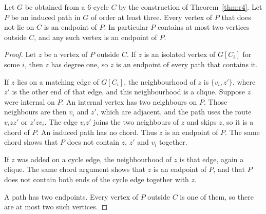 \documentclass[ASNA]{USG}
\theoremstyle{WBstyletwo}
\numberwithin{equation}{section}
\begin{document}
\begin{lemma}\label{lem:ends}
Let $G$ be obtained from a $6$-cycle $C$ by the construction of Theorem~\ref{thm:r4}. Let $P$ be an induced path in $G$ of order at least three. Every vertex of $P$ that does not lie on $C$ is an endpoint of $P$. In particular $P$ contains at most two vertices outside $C$, and any such vertex is an endpoint of $P$.
\end{lemma}

\begin{proof}
Let $z$ be a vertex of $P$ outside $C$. If $z$ is an isolated vertex of $G[C_i]$ for some $i$, then $z$ has degree one, so $z$ is an endpoint of every path that contains it.

If $z$ lies on a matching edge of $G[C_i]$, the neighbourhood of $z$ is $\{v_i,z'\}$, where $z'$ is the other end of that edge, and this neighbourhood is a clique. Suppose $z$ were internal on $P$. An internal vertex has two neighbours on $P$. Those neighbours are then $v_i$ and $z'$, which are adjacent, and the path uses the route $v_iz z'$ or $z'z v_i$. The edge $v_iz'$ joins the two neighbours of $z$ and skips $z$, so it is a chord of $P$. An induced path has no chord. Thus $z$ is an endpoint of $P$. The same chord shows that $P$ does not contain $z$, $z'$ and $v_i$ together.

If $z$ was added on a cycle edge, the neighbourhood of $z$ is that edge, again a clique. The same chord argument shows that $z$ is an endpoint of $P$, and that $P$ does not contain both ends of the cycle edge together with $z$.

A path has two endpoints. Every vertex of $P$ outside $C$ is one of them, so there are at most two such vertices.
\end{proof}
\end{document}
